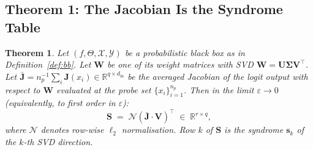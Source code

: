 \documentclass[11pt,a4paper]{article}
\newtheorem{theorem}{Theorem}[section]
\theoremstyle{definition}
\newcommand{\Wm}{\mathbf{W}}
\newcommand{\Um}{\mathbf{U}}
\newcommand{\Vm}{\mathbf{V}}
\newcommand{\Sm}{\mathbf{S}}
\newcommand{\Jm}{\mathbf{J}}
\newcommand{\Sig}{\boldsymbol{\Sigma}}
\newcommand{\sk}[1][]{\mathbf{s}_{#1}}
\newcommand{\Rbb}{\mathbb{R}}
\newcommand{\Nop}{\mathcal{N}}
\newcommand{\dimin}{d_{\mathrm{in}}}
\begin{document}
\subsection{Theorem 1: The Jacobian Is the Syndrome Table}
\label{sec:thm1}

\begin{thmbox}
\begin{theorem}
\label{thm:main}
Let $(f, \Theta, \mathcal{X}, \mathcal{Y})$ be a probabilistic black box as in Definition~\ref{def:bb}. Let $\Wm$ be one of its weight matrices with SVD $\Wm = \Um\Sig\Vm^\top$. Let $\bar{\Jm} = n_p^{-1} \sum_i \Jm(x_i) \in \Rbb^{q\times\dimin}$ be the averaged Jacobian of the logit output with respect to $\Wm$ evaluated at the probe set $\{x_i\}_{i=1}^{n_p}$. Then in the limit $\varepsilon\to 0$ (equivalently, to first order in $\varepsilon$):
\begin{equation}
  \Sm \;=\; \Nop\!\left(\bar{\Jm}\cdot \Vm\right)^\top
  \;\in\;\Rbb^{r\times q},
  \label{eq:main_thm}
\end{equation} 
where $\Nop$ denotes row-wise $\ell_2$ normalisation. Row $k$ of $\Sm$ is the syndrome $\sk[k]$ of the $k$-th SVD direction.
\end{theorem}
\end{thmbox}
\end{document}
